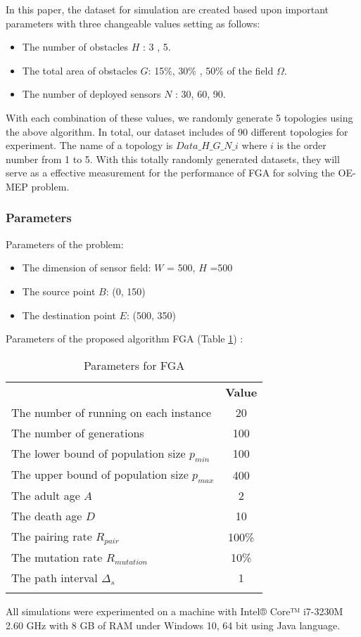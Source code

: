 \documentclass[final]{elsarticle}
\begin{document}
In this paper, the dataset for simulation are created based upon important parameters with three changeable values setting as follows:
\begin{itemize}
	\item The number of obstacles $H$ : 3 , 5.
	\item The total area of obstacles $G$: 15\%, 30\% , 50\% of the field $\Omega$.
	\item The number of deployed sensors $N$ : 30, 60, 90.
\end{itemize}
With each combination of these values, we randomly generate 5 topologies using the above algorithm. In total, our dataset includes of 90 different topologies for experiment. The name of a topology is $Data\_H\_G\_N\_i$ where $ i $ is the order number from 1 to 5. With this totally randomly generated datasets, they will serve as a effective measurement for the performance of FGA for solving the OE-MEP problem. 

\subsubsection{Parameters}
Parameters of the problem:
\begin{itemize}
	\item The dimension of sensor field: $ W $ = 500, $ H $ =500
	\item The source point $ B $: (0, 150) 
	\item The destination point $ E $: (500, 350)	
\end{itemize}
Parameters of the proposed algorithm FGA (Table \ref{tab1}) :
\begin{table}
	\caption{Parameters for FGA}
	\label{tab1}       %
	\begin{center}
		\renewcommand{\arraystretch}{1.5}
		\begin{tabular}{lc}
			\hline\noalign{\smallskip}
			\multicolumn{1}{c}{\textbf{Parameter}} & \textbf{Value} \\
			\noalign{\smallskip}\hline\noalign{\smallskip}
			The number of running on each instance & 20 \\
			The number of generations & 100\\
			The lower bound of population size $ p_{min} $ & 100\\
			The upper bound of population size $ p_{max} $ & 400\\
			The adult age $A$ & 2 \\
			The death age $D$ & 10 \\
			The pairing rate $ R_{pair}$  & 100\% \\
			The mutation rate $ R_{mutation} $ & 10\% \\
			The path interval $\Delta_s$ & 1 \\ 
			\noalign{\smallskip} \hline
		\end{tabular}
	\end{center}
\end{table}
All simulations were experimented on a machine with Intel® Core™ i7-3230M 2.60 GHz with 8 GB of RAM under Windows 10, 64 bit using Java language.
\end{document}
